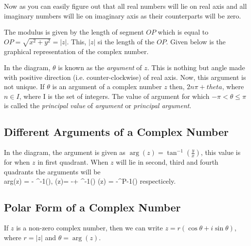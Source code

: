 Now as you can easily figure out that all real numbers will lie on real axis and all imaginary numbers will lie on imaginary axis
as their counterparts will be zero.

The modulus is given by the length of segment $OP$ which is equal to $OP=\sqrt{x^2+y^2}=|z|$. This, $|z|$ si the length of the
$OP$. Given below is the graphical representation of the complex number.


In the diagram, $\theta$ is known as the {\it argument} of $z$. This is nothing but angle made with positive direction
(i.e. counter-clockwise) of real axis. Now, this argument is not unique. If $\theta$ is an argument of a complex number $z$ then,
$2n\pi + theta$, where $n\in I$, where I is the set of integers. The value of argument for which $-\pi<\theta\leq \pi$ is called
the {\it principal value} of {\it argument} or {\it principal argument}.

\subsection{Different Arguments of a Complex Number}
In the diagram, the argument is given as $\arg(z) = \tan^{-1}\left(\frac{y}{x}\right)$, this value is for when $z$ in first
quadrant. When $z$ will lie in second, third and fourth quadrants the arguments will be
\startformula \\arg(z) = \pi - \tan^{-1}\left(\right), \arg(z)= -\pi + \tan^{-1}\left(\right)\;\; \arg(z) =
-\tan^P{-1}\left(\right)\stopformula
respecticely.

\subsection{Polar Form of a Complex Number}
If $z$ is a non-zero complex number, then we can write $z = r(\cos\theta + i\sin\theta)$, where $r = |z|$ and $\theta = \arg(z)$.

